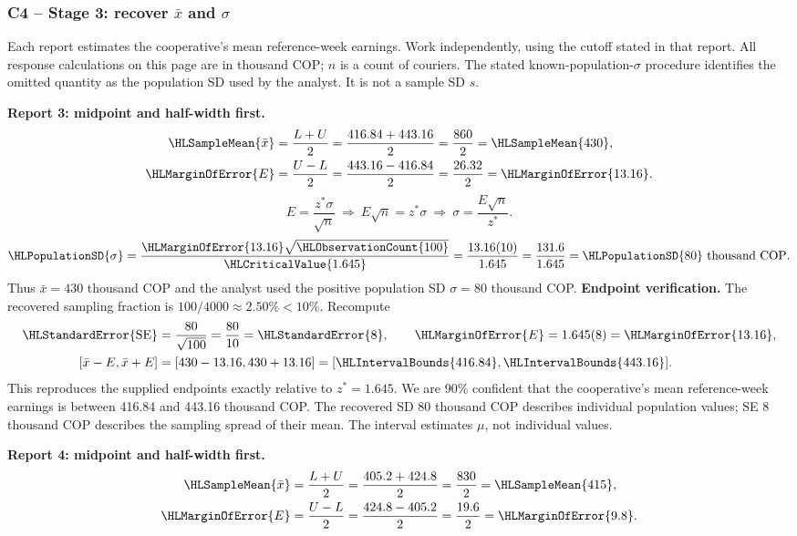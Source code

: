 \subsubsection*{C4 -- Stage 3: recover $\bar x$ and $\sigma$}\label{sol:c4-1-c}
Each report estimates the cooperative's mean reference-week earnings. Work independently, using the cutoff stated in that report. All response calculations on this page are in thousand COP; $n$ is a count of couriers.
The stated known-population-$\sigma$ procedure identifies the omitted quantity as the population SD used by the analyst. It is not a sample SD $s$.
\par\noindent\textbf{Report 3: midpoint and half-width first.}
\[\begin{aligned}
\HLSampleMean{\bar x}&=\frac{L+U}{2}=\frac{416.84+443.16}{2}=\frac{860}{2}=\HLSampleMean{430},\\
\HLMarginOfError{E}&=\frac{U-L}{2}=\frac{443.16-416.84}{2}=\frac{26.32}{2}=\HLMarginOfError{13.16}.
\end{aligned}\]
\[E=\frac{z^*\sigma}{\sqrt n}\ \Longrightarrow\ E\sqrt n=z^*\sigma\ \Longrightarrow\ \sigma=\frac{E\sqrt n}{z^*}.\]
\[\HLPopulationSD{\sigma}=\frac{\HLMarginOfError{13.16}\sqrt{\HLObservationCount{100}}}{\HLCriticalValue{1.645}}=\frac{13.16(10)}{1.645}=\frac{131.6}{1.645}=\HLPopulationSD{80}\text{ thousand COP}.\]
Thus $\bar x=430$ thousand COP and the analyst used the positive population SD $\sigma=80$ thousand COP.
\textbf{Endpoint verification.} The recovered sampling fraction is $100/4000\approx 2.50\%<10\%$. Recompute
\[\begin{aligned}
\HLStandardError{\mathrm{SE}}&=\frac{80}{\sqrt{100}}=\frac{80}{10}=\HLStandardError{8},\qquad \HLMarginOfError{E}=1.645(8)=\HLMarginOfError{13.16},\\
[\bar x-E,\bar x+E]&=[430-13.16,430+13.16]=[\HLIntervalBounds{416.84},\HLIntervalBounds{443.16}].
\end{aligned}\]
This reproduces the supplied endpoints exactly relative to $z^*=1.645$. We are 90\% confident that the cooperative's mean reference-week earnings is between 416.84 and 443.16 thousand COP.
The recovered SD 80 thousand COP describes individual population values; SE 8 thousand COP describes the sampling spread of their mean. The interval estimates $\mu$, not individual values.
\par\noindent\textbf{Report 4: midpoint and half-width first.}
\[\begin{aligned}
\HLSampleMean{\bar x}&=\frac{L+U}{2}=\frac{405.2+424.8}{2}=\frac{830}{2}=\HLSampleMean{415},\\
\HLMarginOfError{E}&=\frac{U-L}{2}=\frac{424.8-405.2}{2}=\frac{19.6}{2}=\HLMarginOfError{9.8}.
\end{aligned}\]
